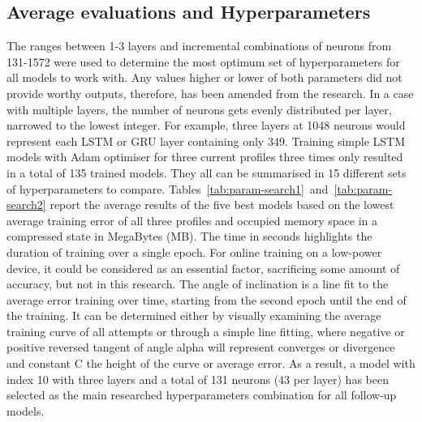 \subsection{Average evaluations and Hyperparameters}
%
The ranges between 1-3 layers and incremental combinations of neurons from 131-1572 were used to determine the most optimum set of hyperparameters for all models to work with.
Any values higher or lower of both parameters did not provide worthy outputs, therefore, has been amended from the research.
In a case with multiple layers, the number of neurons gets evenly distributed per layer, narrowed to the lowest integer.
For example, three layers at 1048 neurons would represent each LSTM or GRU layer containing only 349.
Training simple LSTM models with Adam optimiser for three current profiles three times only resulted in a total of 135 trained models.
They all can be summarised in 15 different sets of hyperparameters to compare.
\mbox{Tables~\ref{tab:param-search1} and~\ref{tab:param-search2}} report the average results of the five best models based on the lowest average training error of all three profiles and occupied memory space in a compressed state in MegaBytes (MB).
The time in seconds highlights the duration of training over a single epoch.
For online training on a low-power device, it could be considered as an essential factor, sacrificing some amount of accuracy, but not in this research.
The angle of inclination is a line fit to the average error training over time, starting from the second epoch until the end of the training.
It can be determined either by visually examining the average training curve of all attempts or through a simple line fitting, where negative or positive reversed tangent of angle alpha will represent converges or divergence and constant C the height of the curve or average error.
%
As a result, a model with index 10 with three layers and a total of 131 neurons (43 per layer) has been selected as the main researched hyperparameters combination for all follow-up models.
